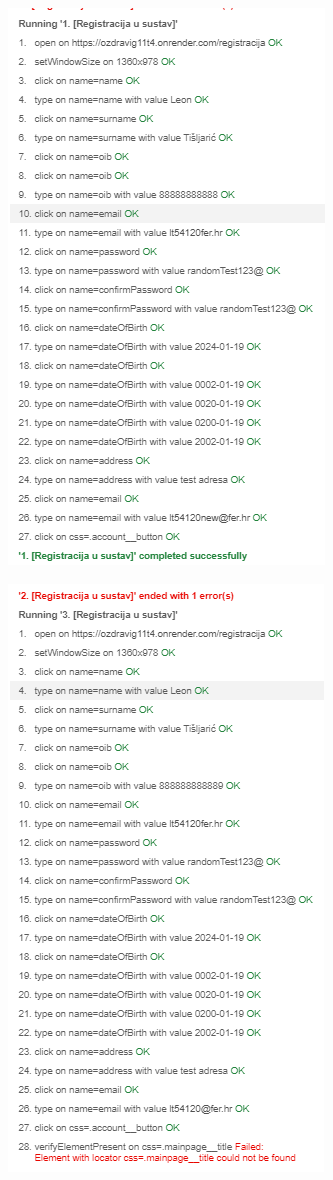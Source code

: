 \begin{figure}[H]
	\includegraphics[scale=0.6]{dijagrami/test21.PNG}
	\centering
	\label{fig:myChart}
\end{figure}

\begin{figure}[H]
	\includegraphics[scale=0.6]{dijagrami/test22.PNG}
	\centering
	\label{fig:myChart}
\end{figure}

